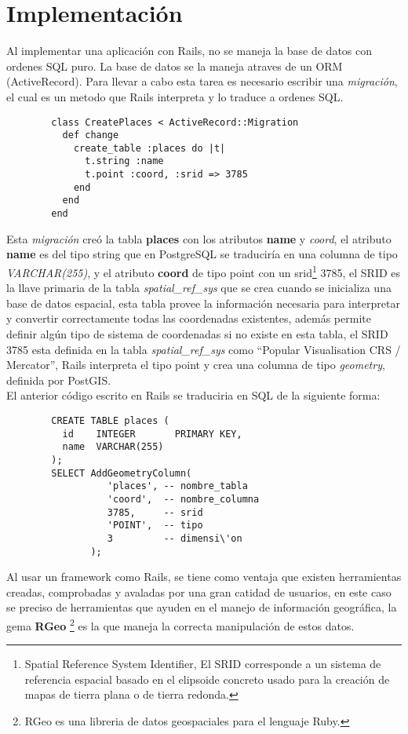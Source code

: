   \section{Implementaci\'on} %
  \label{sec:Implementacion}
    Al implementar una aplicaci\'on con Rails, no se maneja la base de datos con ordenes SQL  puro. La base de datos se la maneja atraves de un ORM (ActiveRecord). 
    Para llevar a cabo esta tarea es necesario escribir una \emph{migraci\'on}, el cual es un metodo que Rails interpreta y lo traduce a ordenes SQL.\\
    \begin{center}
      \begin{verbatim}
        class CreatePlaces < ActiveRecord::Migration
          def change
            create_table :places do |t|
              t.string :name
              t.point :coord, :srid => 3785 
            end
          end
        end
      \end{verbatim}
    \end{center}
    Esta \emph{migraci\'on} cre\'o la tabla \textbf{places} con los atributos \textbf{name} y \emph{coord}, el atributo \textbf{name} es del tipo string que en PostgreSQL se traducir\'ia en una columna de tipo \emph{VARCHAR(255)}, y el atributo \textbf{coord} de tipo point con un srid\footnote{ Spatial Reference System Identifier, El SRID corresponde a un sistema de referencia espacial basado en el elipsoide concreto usado para la creación de mapas de tierra plana o de tierra redonda.\cite{msdn_srid} } 3785,     el SRID  es la llave primaria de la tabla \emph{spatial\_ref\_sys} que se crea cuando se inicializa una base de datos espacial, esta tabla provee la informaci\'on necesaria para interpretar y convertir correctamente todas las coordenadas existentes, adem\'as permite definir alg\'un tipo de sistema de coordenadas si no existe en esta tabla, el SRID 3785 esta definida en la tabla \emph{spatial\_ref\_sys}  como ``Popular Visualisation CRS / Mercator'', Rails interpreta el tipo point y crea una columna de tipo \emph{geometry}, definida por PostGIS.\\

    El anterior código escrito en Rails se traduciria en SQL de la siguiente forma: 
    \begin{center}
      \begin{verbatim}
        CREATE TABLE places (
          id    INTEGER       PRIMARY KEY,
          name  VARCHAR(255)
        );
        SELECT AddGeometryColumn(
                  'places', -- nombre_tabla
                  'coord',  -- nombre_columna
                  3785,     -- srid
                  'POINT',  -- tipo
                  3         -- dimensi\'on
               );
      \end{verbatim}
    \end{center}
    Al usar un framework como Rails, se tiene como ventaja que existen herramientas creadas, comprobadas y avaladas por una gran catidad de usuarios, en este caso se preciso de herramientas que ayuden en el  manejo de informaci\'on geogr\'afica, la gema \textbf{RGeo} \footnote{ RGeo es una libreria de datos geospaciales  para el lenguaje Ruby.} es la que maneja  la correcta manipulaci\'on de estos datos.\\

